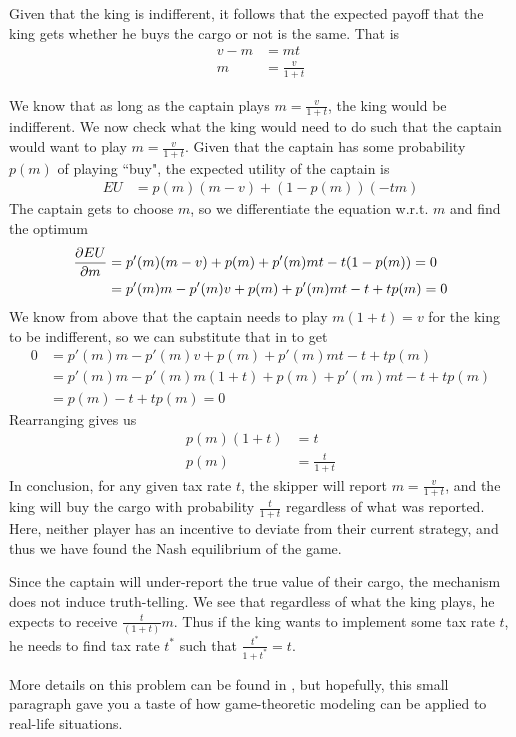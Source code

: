 Given that the king is indifferent, it follows that the expected payoff that the king gets whether he buys the cargo or not is the same. That is
\begin{align*}
    v - m &= mt \\
    m &= \frac{v}{1 + t}
\end{align*}

We know that as long as the captain plays $m = \frac{v}{1 + t}$, the king would be indifferent. We now check what the king would need to do such that the captain would want to play $m = \frac{v}{1+t}$. Given that the captain has some probability $p(m)$ of playing ``buy", the expected utility of the captain is
\begin{align*}
    EU &= p(m)(m - v) + (1 - p(m))(-tm)
\end{align*}
The captain gets to choose $m$, so we differentiate the equation w.r.t. $m$ and find the optimum
\begin{align*}
    \frac{\partial EU}{\partial m} & = p'(m)(m-v) + p(m) + p'(m)mt -t(1-p(m)) = 0 \\
    & = p'(m)m - p'(m)v + p(m) + p'(m)mt -t + tp(m) = 0
\end{align*}
We know from above that the captain needs to play $m(1+t) = v$ for the king to be indifferent, so we can substitute that in to get
\begin{align*}
    0 & = p'(m)m - p'(m)v + p(m) + p'(m)mt -t + tp(m) \\
    & =  p'(m)m - p'(m)m(1+t)  + p(m) + p'(m)mt -t + tp(m) \\
    & = p(m) -t + tp(m) = 0
\end{align*}
Rearranging gives us
\begin{align*}
    p(m)(1 + t) & = t\\
    p(m) & = \frac{t}{1+t}
\end{align*}
In conclusion, for any given tax rate $t$, the skipper will report $m = \frac{v}{1+t}$, and the king will buy the cargo with probability $\frac{t}{1+t}$ regardless of what was reported. Here, neither player has an incentive to deviate from their current strategy, and thus we have found the Nash equilibrium of the game. 

Since the captain will under-report the true value of their cargo, the mechanism does not induce truth-telling. We see that regardless of what the king plays, he expects to receive $\frac{t}{(1+t)}m$. Thus if the king wants to implement some tax rate $t$, he needs to find tax rate $t^*$ such that $\frac{t^*}{1+t^*} = t$.

More details on this problem can be found in \citet{Haan_2012_Taxation}, but hopefully, this small paragraph gave you a taste of how game-theoretic modeling can be applied to real-life situations. 